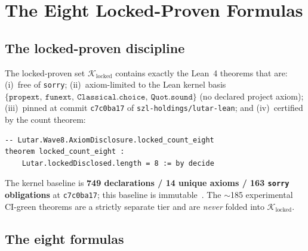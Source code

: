 \documentclass[11pt,letterpaper]{article}
\theoremstyle{definition}
\newcommand{\kernelaxioms}%
  {\{\texttt{propext},\allowbreak\ \texttt{funext},\allowbreak\ \texttt{Classical.choice},\allowbreak\ \texttt{Quot.sound}\}}
\begin{document}
\section{The Eight Locked-Proven Formulas}
\label{sec:locked8}

\subsection{The locked-proven discipline}

The locked-proven set $\mathcal{K}_{\text{locked}}$ contains exactly the Lean~4
theorems that are: (i)~free of \texttt{sorry}; (ii)~axiom-limited to the Lean
kernel basis $\kernelaxioms$ (no declared project axiom); (iii)~pinned at commit
\texttt{c7c0ba17} of \texttt{szl-holdings/lutar-lean}; and (iv)~certified by the
count theorem:
\begin{lstlisting}
-- Lutar.Wave8.AxiomDisclosure.locked_count_eight
theorem locked_count_eight :
    Lutar.lockedDisclosed.length = 8 := by decide
\end{lstlisting}
The kernel baseline is \textbf{749 declarations / 14 unique axioms /
163 \texttt{sorry} obligations} at \texttt{c7c0ba17}; this baseline is
immutable~\cite{szl_v26,lutarlean}.  The $\sim$185 experimental CI-green theorems
are a strictly separate tier and are \emph{never} folded into $\mathcal{K}_{\text{locked}}$.

\subsection{The eight formulas}
\end{document}
